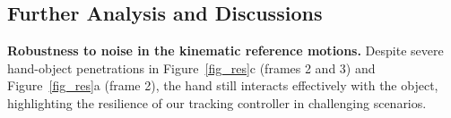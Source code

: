 \vspace{-10pt}
\subsection{Further Analysis and Discussions} \label{sec:exp_analysis}
\vspace{-5pt}


\noindent\textbf{Robustness to noise in the kinematic reference motions.} 
Despite severe hand-object penetrations in Figure~\ref{fig_res}c (frames 2 and 3) and Figure~\ref{fig_res}a (frame 2), the hand still interacts effectively with the object, highlighting the resilience of our tracking controller in challenging scenarios.








